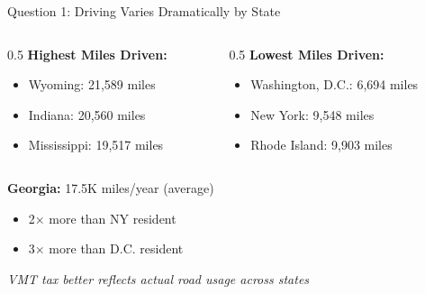 \documentclass[aspectratio=169]{beamer}
\begin{document}
\begin{frame}{Question 1: Driving Varies Dramatically by State}
\begin{columns}
\begin{column}{0.5\textwidth}
\textbf{Highest Miles Driven:}
\begin{itemize}
\item Wyoming: 21,589 miles
\item Indiana: 20,560 miles
\item Mississippi: 19,517 miles
\end{itemize}
\end{column}
\begin{column}{0.5\textwidth}
\textbf{Lowest Miles Driven:}
\begin{itemize}
\item Washington, D.C.: 6,694 miles
\item New York: 9,548 miles
\item Rhode Island: 9,903 miles
\end{itemize}
\end{column}
\end{columns}

\vspace{0.5cm}
\textbf{Georgia:} 17.5K miles/year (average)
\begin{itemize}
\item 2$\times$ more than NY resident
\item 3$\times$ more than D.C. resident
\end{itemize}

\vspace{0.3cm}
\textit{VMT tax better reflects actual road usage across states}
\end{frame}

\end{document}
